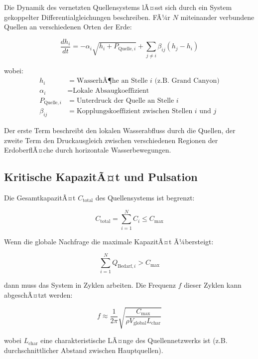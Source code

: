 ﻿\documentclass[12pt,a4paper]{report}
\begin{document}
Die Dynamik des vernetzten Quellensystems lÃ¤sst sich durch ein System gekoppelter Differentialgleichungen beschreiben. FÃ¼r $N$ miteinander verbundene Quellen an verschiedenen Orten der Erde:

\begin{equation}
	\frac{dh_i}{dt} = -\alpha_i \sqrt{h_i + P_{\text{Quelle},i}} + \sum_{j \neq i} \beta_{ij}(h_j - h_i)
\end{equation}

wobei:
\begin{align}
	h_i &= \text{WasserhÃ¶he an Stelle } i \text{ (z.B. Grand Canyon)} \\
	\alpha_i &= \text{Lokale Absaugkoeffizient} \\
	P_{\text{Quelle},i} &= \text{Unterdruck der Quelle an Stelle } i \\
	\beta_{ij} &= \text{Kopplungskoeffizient zwischen Stellen } i \text{ und } j
\end{align}

Der erste Term beschreibt den lokalen Wasserabfluss durch die Quellen, der zweite Term den Druckausgleich zwischen verschiedenen Regionen der ErdoberflÃ¤che durch horizontale Wasserbewegungen.

\subsection{Kritische KapazitÃ¤t und Pulsation}

Die GesamtkapazitÃ¤t $C_{\text{total}}$ des Quellensystems ist begrenzt:

\begin{equation}
	C_{\text{total}} = \sum_{i=1}^{N} C_i \leq C_{\text{max}}
\end{equation}

Wenn die globale Nachfrage die maximale KapazitÃ¤t Ã¼bersteigt:

\begin{equation}
	\sum_{i=1}^{N} Q_{\text{Bedarf},i} > C_{\text{max}}
\end{equation}

dann muss das System in Zyklen arbeiten. Die Frequenz $f$ dieser Zyklen kann abgeschÃ¤tzt werden:

\begin{equation}
	f \approx \frac{1}{2\pi} \sqrt{\frac{C_{\text{max}}}{\rho V_{\text{global}} L_{\text{char}}}}
\end{equation}

wobei $L_{\text{char}}$ eine charakteristische LÃ¤nge des Quellennetzwerks ist (z.B. durchschnittlicher Abstand zwischen Hauptquellen).
\end{document}

